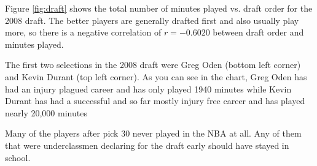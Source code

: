 \documentclass[letterpaper, landscape]{exam}
\begin{document}
\begin{questions}
        Figure \ref{fig:draft} shows the total number of minutes played vs.  draft
        order for the 2008 draft.  The better players are generally drafted first
        and also usually play more, so there is a negative correlation of 
        $r = -0.6020$ between draft order and minutes played.

        The first two selections in the 2008 draft were Greg Oden (bottom left
        corner) and Kevin Durant (top left corner).  As you can see in the
        chart, Greg Oden has had an injury plagued career and has only played
        1940 minutes while Kevin Durant has had a successful and so far mostly
        injury free career and has played nearly 20,000 minutes

        Many of the players after pick 30 never played in the NBA at all.  Any
        of them that were underclassmen declaring for the draft early should
        have stayed in school.

\end{questions}
\end{document}
